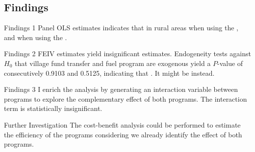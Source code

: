 \documentclass[
11pt,notheorems,compress,hyperref={pdfauthor=Maghfira Ramadhani}
]{beamer}
\begin{document}
\subsection{Findings}
\begin{frame}
    \begin{block}{Findings 1}
        Panel OLS estimates indicates that  in rural areas when using the , and  when using the . \hyperlink{POLS}{}\label{POLSclick}
    \end{block}
    \pause\begin{block}{Findings 2}
        FEIV estimates yield insignificant estimates. Endogeneity tests against $H_0$ that village fund transfer and fuel program are exogenous yield a $P$-value of consecutively 0.9103 and 0.5125, indicating that . It might be  instead. \hyperlink{FEIV}{}\label{FEIVclick} \hyperlink{FEIV2}{}
    \end{block}
    \pause\begin{block}{Findings 3}
        I enrich the analysis by generating an interaction variable between programs to explore the complementary effect of both programs. The interaction term is statistically insignificant. \hyperlink{POLS1}{}
    \end{block}
    \pause\begin{block}{Further Investigation}
        The cost-benefit analysis could be performed to estimate the efficiency of the programs considering we already identify the effect of both programs.
    \end{block}
\end{frame}

   
\end{document}
